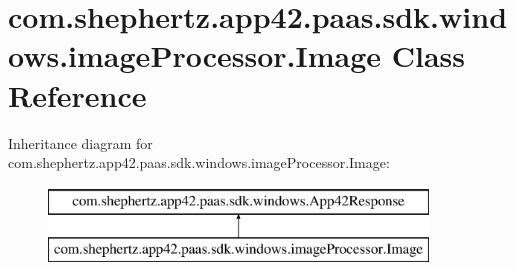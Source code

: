 \hypertarget{classcom_1_1shephertz_1_1app42_1_1paas_1_1sdk_1_1windows_1_1image_processor_1_1_image}{\section{com.\+shephertz.\+app42.\+paas.\+sdk.\+windows.\+image\+Processor.\+Image Class Reference}
\label{classcom_1_1shephertz_1_1app42_1_1paas_1_1sdk_1_1windows_1_1image_processor_1_1_image}
}
Inheritance diagram for com.\+shephertz.\+app42.\+paas.\+sdk.\+windows.\+image\+Processor.\+Image\+:\begin{figure}[H]
\begin{center}
\leavevmode
\includegraphics[height=2.000000cm]{classcom_1_1shephertz_1_1app42_1_1paas_1_1sdk_1_1windows_1_1image_processor_1_1_image}
\end{center}
\end{figure}
